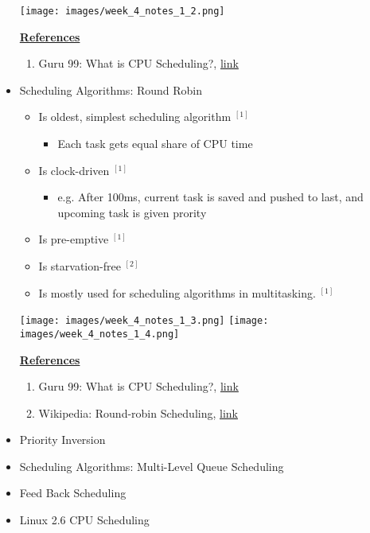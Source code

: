 \documentclass[12pt]{article}
\begin{document}
\begin{itemize}
    \bigskip

    \begin{center}
    \texttt{[image: images/week\_4\_notes\_1\_2.png]}
    \end{center}

    \underline{\textbf{References}}

    \begin{enumerate}[1)]
        \item Guru 99: What is CPU Scheduling?, \href{https://www.guru99.com/cpu-scheduling-algorithms.html#8}{link}
    \end{enumerate}

    \item Scheduling Algorithms: Round Robin
    \begin{itemize}
        \item Is oldest, simplest scheduling algorithm $^{[1]}$
        \begin{itemize}
            \item Each task gets equal share of CPU time
        \end{itemize}
        \item Is clock-driven $^{[1]}$
        \begin{itemize}
            \item e.g. After 100ms, current task is saved and pushed to last, and
            upcoming task is given prority
        \end{itemize}
        \item Is pre-emptive $^{[1]}$
        \item Is starvation-free $^{[2]}$
        \item Is mostly used for scheduling algorithms in multitasking. $^{[1]}$
    \end{itemize}

    \bigskip

    \begin{center}
    \texttt{[image: images/week\_4\_notes\_1\_3.png]}
    \texttt{[image: images/week\_4\_notes\_1\_4.png]}
    \end{center}

    \underline{\textbf{References}}

    \begin{enumerate}[1)]
        \item Guru 99: What is CPU Scheduling?, \href{https://www.guru99.com/cpu-scheduling-algorithms.html#8}{link}
        \item Wikipedia: Round-robin Scheduling, \href{https://en.wikipedia.org/wiki/Round-robin_scheduling}{link}
    \end{enumerate}
    \item Priority Inversion
    \item Scheduling Algorithms: Multi-Level Queue Scheduling
    \item Feed Back Scheduling
    \item Linux 2.6 CPU Scheduling
\end{itemize}
\end{document}
